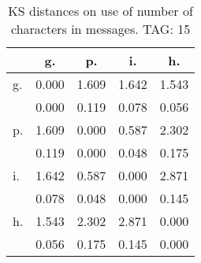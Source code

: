 \begin{table}[h!]
\begin{center}
\begin{tabular}{| l | c | c | c | c |}\hline
 & g. & p. & i. & h. \\\hline
g. & 0.000  & 1.609  & 1.642  & 1.543 \\\hline
 & 0.000  & 0.119  & 0.078  & 0.056 \\\hline
p. & 1.609  & 0.000  & 0.587  & 2.302 \\\hline
 & 0.119  & 0.000  & 0.048  & 0.175 \\\hline
i. & 1.642  & 0.587  & 0.000  & 2.871 \\\hline
 & 0.078  & 0.048  & 0.000  & 0.145 \\\hline
h. & 1.543  & 2.302  & 2.871  & 0.000 \\\hline
 & 0.056  & 0.175  & 0.145  & 0.000 \\\hline
\end{tabular}
\caption{KS distances on use of number of characters in messages. TAG: 15}
\end{center}
\end{table}
